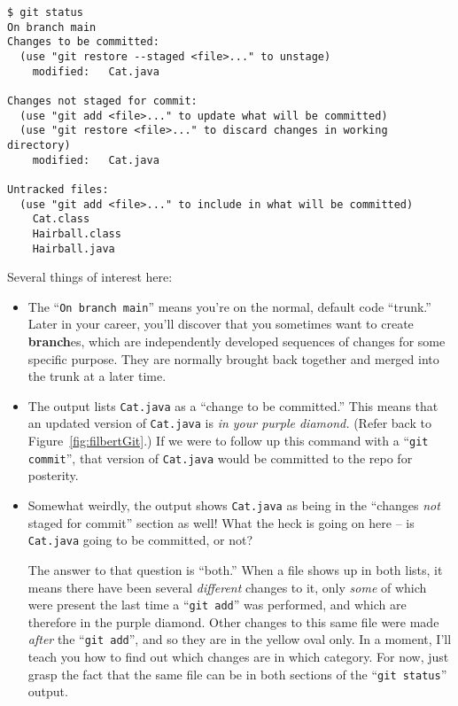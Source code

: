 \begin{Verbatim}[fontsize=\scriptsize,samepage=true,frame=single]
$ git status
On branch main
Changes to be committed:
  (use "git restore --staged <file>..." to unstage)
    modified:   Cat.java

Changes not staged for commit:
  (use "git add <file>..." to update what will be committed)
  (use "git restore <file>..." to discard changes in working directory)
    modified:   Cat.java

Untracked files:
  (use "git add <file>..." to include in what will be committed)
    Cat.class
    Hairball.class
    Hairball.java
\end{Verbatim}

Several things of interest here:

\begin{itemize}

\item The ``\texttt{On branch main}'' means you're on the normal, default code
``trunk.'' Later in your career, you'll discover that you sometimes want to
create \textbf{branch}es, which are independently developed sequences of
changes for some specific purpose. They are normally brought back together and
merged into the trunk at a later time.

\item The output lists \texttt{Cat.java} as a ``change to be committed.'' This
means that an updated version of \texttt{Cat.java} is \textit{in your purple
diamond.} (Refer back to Figure~\ref{fig:filbertGit}.) If we were to follow up
this command with a ``\texttt{git commit}'', that version of \texttt{Cat.java}
would be committed to the repo for posterity.

\item Somewhat weirdly, the output shows \texttt{Cat.java} as being in the
``changes \textit{not} staged for commit'' section as well! What the heck is
going on here -- is \texttt{Cat.java} going to be committed, or not?

The answer to that question is ``both.'' When a file shows up in both lists,
it means there have been several \textit{different} changes to it, only
\textit{some} of which were present the last time a ``\texttt{git add}'' was
performed, and which are therefore in the purple diamond. Other changes to this
same file were made \textit{after} the ``\texttt{git add}'', and so they are
in the yellow oval only. In a moment, I'll teach you how to find out which
changes are in which category. For now, just grasp the fact that the same file
can be in both sections of the ``\texttt{git status}'' output.


\end{itemize}
